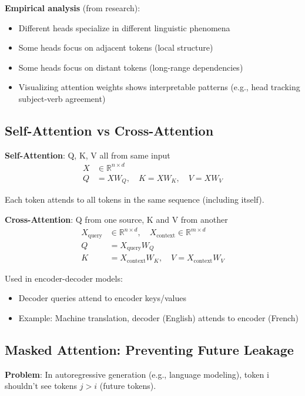 \textbf{Empirical analysis} (from research):
\begin{itemize}
\item Different heads specialize in different linguistic phenomena
\item Some heads focus on adjacent tokens (local structure)
\item Some heads focus on distant tokens (long-range dependencies)
\item Visualizing attention weights shows interpretable patterns (e.g., head tracking subject-verb agreement)
\end{itemize}

\subsection{Self-Attention vs Cross-Attention}

\textbf{Self-Attention}: Q, K, V all from same input
\begin{align*}
X &\in \mathbb{R}^{n \times d} \\
Q &= XW_Q, \quad K = XW_K, \quad V = XW_V
\end{align*}

Each token attends to all tokens in the same sequence (including itself).

\textbf{Cross-Attention}: Q from one source, K and V from another
\begin{align*}
X_{\text{query}} &\in \mathbb{R}^{n \times d}, \quad X_{\text{context}} \in \mathbb{R}^{m \times d} \\
Q &= X_{\text{query}} W_Q \\
K &= X_{\text{context}} W_K, \quad V = X_{\text{context}} W_V
\end{align*}

Used in encoder-decoder models:
\begin{itemize}
\item Decoder queries attend to encoder keys/values
\item Example: Machine translation, decoder (English) attends to encoder (French)
\end{itemize}

\subsection{Masked Attention: Preventing Future Leakage}

\textbf{Problem}: In autoregressive generation (e.g., language modeling), token i shouldn't see tokens $j > i$ (future tokens).

